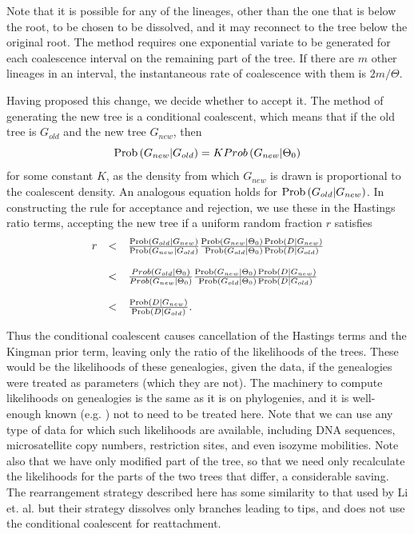 Note that it is possible for any of the lineages, other than the one that
is below the root, to be chosen to be dissolved, and it may reconnect to the
tree below the original root.  The method requires one exponential variate
to be generated
for each coalescence interval on the remaining part of the tree.  If there
are $m$ other lineages in an interval, the instantaneous rate of coalescence
with them is $2m/\Theta$.

Having proposed this change, we decide whether to accept it.  The method of
generating the new tree is a conditional coalescent, which means that if the
old tree is $G_{old}$ and the new tree $G_{new}$, then 
\begin{equation}
\mathop{\rm Prob}\nolimits\left(G_{new}|G_{old}\right) = K Prob\left(G_{new}|\Theta_0\right)
\end{equation}
for some constant $K$, as the density from which $G_{new}$ is drawn is
proportional to the coalescent density.  An analogous equation holds for
$\mathop{\rm Prob}\nolimits\left(G_{old}|G_{new}\right)$.  In constructing the rule for
acceptance and rejection, we use these in the Hastings ratio terms,
accepting the new tree if a uniform random fraction $r$ satisfies
\begin{equation}
\begin{array}{c c l}
r & < & {\mathop{\rm Prob}\nolimits\left(G_{old}|G_{new}\right) \over \mathop{\rm Prob}\nolimits\left(G_{new}|G_{old}\right)}
{\mathop{\rm Prob}\nolimits\left(G_{new}|\Theta_0\right)\mathop{\rm Prob}\nolimits\left(D|G_{new}\right)  \over \mathop{\rm Prob}\nolimits\left(G_{old}|\Theta_0\right)\mathop{\rm Prob}\nolimits\left(D|G_{old}\right) }\\
  &  & \\
 & < & {Prob\left(G_{old}|\Theta_0\right) \over Prob\left(G_{new}|\Theta_0\right) }
{\mathop{\rm Prob}\nolimits\left(G_{new}|\Theta_0\right)\mathop{\rm Prob}\nolimits\left(D|G_{new}\right) \over \mathop{\rm Prob}\nolimits\left(G_{old}|\Theta_0\right)\mathop{\rm Prob}\nolimits\left(D|G_{old}\right) }\\
  &  & \\
 & < & {\mathop{\rm Prob}\nolimits\left(D|G_{new}\right) \over \mathop{\rm Prob}\nolimits\left(D|G_{old}\right) }.
\end{array}
\end{equation}

Thus the conditional coalescent causes cancellation of the Hastings terms and
the Kingman prior term, leaving only the ratio of the likelihoods of the trees.
These would be the likelihoods of these genealogies, given the data, if the
genealogies were treated as parameters (which they are not).  The machinery
to compute likelihoods on genealogies is the same as it is on phylogenies, and
it is well-enough known (e.g. \cite{Fels81}) not to need to be treated here.
Note that we can use any type of data for which such likelihoods are available, 
including DNA sequences, microsatellite copy numbers, restriction sites, and
even isozyme mobilities.  Note also that we have only modified part of the
tree, so that we need only recalculate the likelihoods for the
parts of the two trees that differ, a considerable saving.
The rearrangement strategy described here has some similarity to that used
by Li et. al. \cite{Shuying} but their strategy dissolves only branches leading
to tips, and does not use the conditional coalescent for reattachment.

